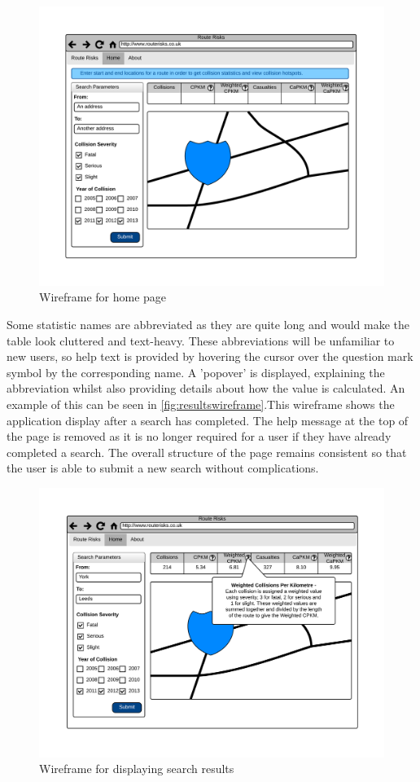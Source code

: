 \documentclass[authoryearcitations]{UoYCSproject}
\begin{document}
\begin{figure}
	\center
	\includegraphics[scale=0.8]{HomePageWireframe}
	\caption{Wireframe for home page}
	\label{fig:homewireframe}
\end{figure}

Some statistic names are abbreviated as they are quite long and would make the table look cluttered and text-heavy. These abbreviations will be unfamiliar to new users, so help text is provided by hovering the cursor over the question mark symbol by the corresponding name. A 'popover' is displayed, explaining the abbreviation whilst also providing details about how the value is calculated. An example of this can be seen in \autoref{fig:resultswireframe}.This wireframe shows the application display after a search has completed. The help message at the top of the page is removed as it is no longer required for a user if they have already completed a search. The overall structure of the page remains consistent so that the user is able to submit a new search without complications.

\begin{figure}
	\center
	\includegraphics[scale=0.8]{ResultsWireframe}
	\caption{Wireframe for displaying search results}
	\label{fig:resultswireframe}
\end{figure}
\end{document}
